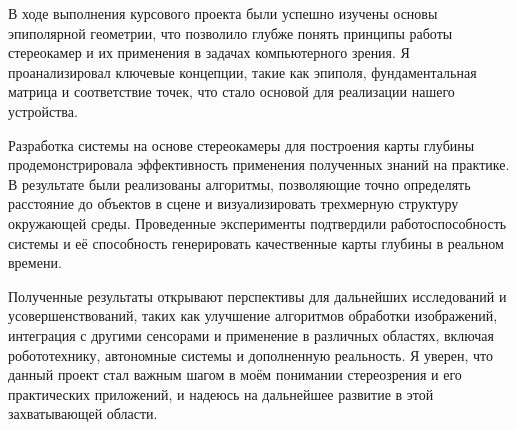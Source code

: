 
В ходе выполнения курсового проекта были успешно изучены основы эпиполярной геометрии, что позволило глубже понять принципы работы стереокамер и их применения в задачах компьютерного зрения. Я проанализировал ключевые концепции, такие как эпиполя, фундаментальная матрица и соответствие точек, что стало основой для реализации нашего устройства.

Разработка системы на основе стереокамеры для построения карты глубины продемонстрировала эффективность применения полученных знаний на практике. В результате были реализованы алгоритмы, позволяющие точно определять расстояние до объектов в сцене и визуализировать трехмерную структуру окружающей среды. Проведенные эксперименты подтвердили работоспособность системы и её способность генерировать качественные карты глубины в реальном времени.

Полученные результаты открывают перспективы для дальнейших исследований и усовершенствований, таких как улучшение алгоритмов обработки изображений, интеграция с другими сенсорами и применение в различных областях, включая робототехнику, автономные системы и дополненную реальность. Я уверен, что данный проект стал важным шагом в моём понимании стереозрения и его практических приложений, и надеюсь на дальнейшее развитие в этой захватывающей области.
